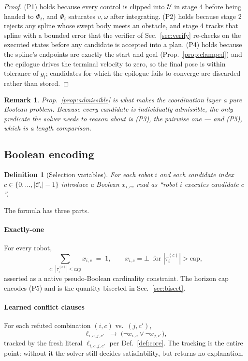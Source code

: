 \documentclass[conference]{IEEEtran}
\newtheorem{definition}{Definition}
\newtheorem{remark}{Remark}
\newcommand{\Cand}{\mathcal{C}}
\newcommand{\Uc}{\mathcal{U}}
\begin{document}
\begin{proof}
(P1) holds because every control is clipped into $\Uc$ in stage 4 before being handed to
$\Phi_i$, and $\Phi_i$ saturates $v,\omega$ after integrating. (P2) holds because stage 2
rejects any spline whose swept body meets an obstacle, and stage 4 tracks that spline with
a bounded error that the verifier of Sec.~\ref{sec:verify} re-checks on the executed states
before any candidate is accepted into a plan. (P4) holds because the spline's endpoints are
exactly the start and goal (Prop.~\ref{prop:clamped}) and the epilogue drives the terminal
velocity to zero, so the final pose is within tolerance of $g_i$; candidates for which the
epilogue fails to converge are discarded rather than stored.
\end{proof}

\begin{remark}
Prop.~\ref{prop:admissible} is what makes the coordination layer a pure Boolean problem.
Because every candidate is individually admissible, the only predicate the solver needs to
reason about is (P3), the pairwise one --- and (P5), which is a length comparison.
\end{remark}

\subsection{Boolean encoding}
\label{sec:encoding}

\begin{definition}[Selection variables]
For each robot $i$ and each candidate index $c \in \{0,\dots,|\Cand_i|-1\}$ introduce a
Boolean $x_{i,c}$, read as ``robot $i$ executes candidate $c$''.
\end{definition}

The formula has three parts.

\paragraph*{Exactly-one}
For every robot,
\begin{equation}
  \sum_{c\,:\,|\tau_i^{(c)}| \le \text{cap}} x_{i,c} \;=\; 1,
  \qquad
  x_{i,c} = \bot \ \text{ for } |\tau_i^{(c)}| > \text{cap},
  \label{eq:exactlyone}
\end{equation}
asserted as a native pseudo-Boolean cardinality constraint. The horizon cap encodes (P5)
and is the quantity bisected in Sec.~\ref{sec:bisect}.

\paragraph*{Learned conflict clauses}
For each refuted combination $(i,c)$ vs.\ $(j,c')$,
\begin{equation}
  \ell_{i,c,j,c'} \;\longrightarrow\; \big(\neg x_{i,c} \vee \neg x_{j,c'}\big),
  \label{eq:clause}
\end{equation}
tracked by the fresh literal $\ell_{i,c,j,c'}$ per Def.~\ref{def:core}. The tracking is the
entire point: without it the solver still decides satisfiability, but returns no
explanation.
\end{document}
